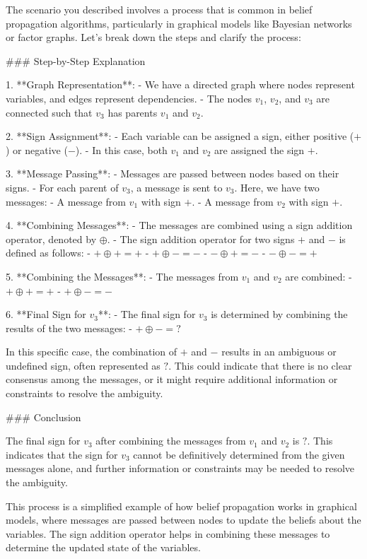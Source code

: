 The scenario you described involves a process that is common in belief propagation algorithms, particularly in graphical models like Bayesian networks or factor graphs. Let's break down the steps and clarify the process:

### Step-by-Step Explanation

1. **Graph Representation**:
   - We have a directed graph where nodes represent variables, and edges represent dependencies.
   - The nodes \( v_1 \), \( v_2 \), and \( v_3 \) are connected such that \( v_3 \) has parents \( v_1 \) and \( v_2 \).

2. **Sign Assignment**:
   - Each variable can be assigned a sign, either positive (\( + \)) or negative (\( - \)).
   - In this case, both \( v_1 \) and \( v_2 \) are assigned the sign \( + \).

3. **Message Passing**:
   - Messages are passed between nodes based on their signs.
   - For each parent of \( v_3 \), a message is sent to \( v_3 \). Here, we have two messages:
     - A message from \( v_1 \) with sign \( + \).
     - A message from \( v_2 \) with sign \( + \).

4. **Combining Messages**:
   - The messages are combined using a sign addition operator, denoted by \( \oplus \).
   - The sign addition operator for two signs \( + \) and \( - \) is defined as follows:
     - \( + \oplus + = + \)
     - \( + \oplus - = - \)
     - \( - \oplus + = - \)
     - \( - \oplus - = + \)

5. **Combining the Messages**:
   - The messages from \( v_1 \) and \( v_2 \) are combined:
     - \( + \oplus + = + \)
     - \( + \oplus - = - \)

6. **Final Sign for \( v_3 \)**:
   - The final sign for \( v_3 \) is determined by combining the results of the two messages:
     - \( + \oplus - = ? \)

In this specific case, the combination of \( + \) and \( - \) results in an ambiguous or undefined sign, often represented as \( ? \). This could indicate that there is no clear consensus among the messages, or it might require additional information or constraints to resolve the ambiguity.

### Conclusion

The final sign for \( v_3 \) after combining the messages from \( v_1 \) and \( v_2 \) is \( ? \). This indicates that the sign for \( v_3 \) cannot be definitively determined from the given messages alone, and further information or constraints may be needed to resolve the ambiguity.

This process is a simplified example of how belief propagation works in graphical models, where messages are passed between nodes to update the beliefs about the variables. The sign addition operator helps in combining these messages to determine the updated state of the variables.